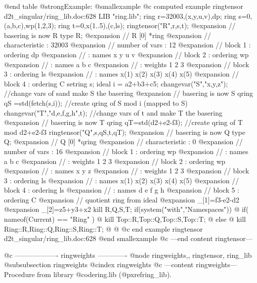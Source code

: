 @end table
@strong{Example:}
@smallexample
@c computed example ringtensor d2t_singular/ring_lib.doc:628 
LIB "ring.lib";
ring r=32003,(x,y,u,v),dp;
ring s=0,(a,b,c),wp(1,2,3);
ring t=0,x(1..5),(c,ls);
ringtensor("R",r,s,t);
@expansion{} // basering is now R
type R;
@expansion{} // R                    [0]  *ring
@expansion{} //   characteristic : 32003
@expansion{} //   number of vars : 12
@expansion{} //        block   1 : ordering dp
@expansion{} //                  : names    x y u v 
@expansion{} //        block   2 : ordering wp
@expansion{} //                  : names    a b c 
@expansion{} //                  : weights  1 2 3 
@expansion{} //        block   3 : ordering ls
@expansion{} //                  : names    x(1) x(2) x(3) x(4) x(5) 
@expansion{} //        block   4 : ordering C
setring s;
ideal i = a2+b3+c5;
changevar("S","x,y,z");       //change vars of sand make S the basering
@expansion{} // basering is now S
qring qS =std(fetch(s,i));    //create qring of S mod i (mapped to S)
changevar("T","d,e,f,g,h",t); //change vars of t and make T the basering
@expansion{} // basering is now T
qring qT=std(d2+e2-f3);       //create qring of T mod d2+e2-f3
ringtensor("Q",s,qS,t,qT);
@expansion{} // basering is now Q
type Q;
@expansion{} // Q                    [0]  *qring
@expansion{} //   characteristic : 0
@expansion{} //   number of vars : 16
@expansion{} //        block   1 : ordering wp
@expansion{} //                  : names    a b c 
@expansion{} //                  : weights  1 2 3 
@expansion{} //        block   2 : ordering wp
@expansion{} //                  : names    x y z 
@expansion{} //                  : weights  1 2 3 
@expansion{} //        block   3 : ordering ls
@expansion{} //                  : names    x(1) x(2) x(3) x(4) x(5) 
@expansion{} //        block   4 : ordering ls
@expansion{} //                  : names    d e f g h 
@expansion{} //        block   5 : ordering C
@expansion{} // quotient ring from ideal
@expansion{} _[1]=f3-e2-d2
@expansion{} _[2]=z5+y3+x2
kill R,Q,S,T;
if(system("with","Namespaces")) @{
if( nameof(Current) == "Ring" ) @{
kill Top::R,Top::Q,Top::S,Top::T;
@} else @{
kill Ring::R,Ring::Q,Ring::S,Ring::T;
@}
@}
@c end example ringtensor d2t_singular/ring_lib.doc:628
@end smallexample
@c ---end content ringtensor---

@c ------------------- ringweights -------------
@node ringweights,, ringtensor, ring_lib
@subsubsection ringweights
@cindex ringweights
@c ---content ringweights---
Procedure from library @code{ring.lib} (@pxref{ring_lib}).

